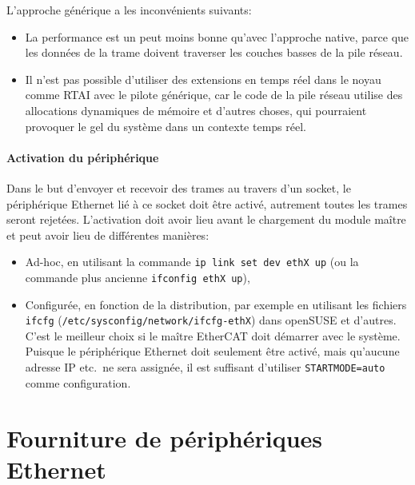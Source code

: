 \documentclass[a4paper,12pt,BCOR=6mm,bibtotoc,idxtotoc]{scrbook}
\begin{document}
L'approche g\'en\'erique a les inconv\'enients suivants:

\begin{itemize}
\item La performance est un peut moins bonne qu'avec l'approche
  native, parce que les donn\'ees de la trame doivent traverser les
  couches basses de la pile r\'eseau.
\item Il n'est pas possible d'utiliser des extensions en temps r\'eel
  dans le noyau comme RTAI avec le pilote g\'en\'erique, car le code
  de la pile r\'eseau utilise des allocations dynamiques de m\'emoire
  et d'autres choses, qui pourraient provoquer le gel du syst\`eme
  dans un contexte temps r\'eel.
\end{itemize}

\paragraph{Activation du p\'eriph\'erique} Dans le but d'envoyer
et recevoir des trames au travers d'un socket, le p\'eriph\'erique
Ethernet li\'e \`a ce socket doit \^etre activ\'e, autrement toutes
les trames seront rejet\'ees.  L'activation doit avoir lieu avant le
chargement du module ma\^itre et peut avoir lieu de diff\'erentes
mani\`eres:

\begin{itemize}

\item Ad-hoc, en utilisant la commande
  \lstinline+ip link set dev ethX up+
  (ou la commande plus ancienne \lstinline+ifconfig ethX up+),

\item Configur\'ee, en fonction de la distribution, par exemple en
  utilisant les fichiers \lstinline+ifcfg+
  (\lstinline+/etc/sysconfig/network/ifcfg-ethX+) dans openSUSE et
  d'autres. C'est le meilleur choix si le ma\^itre EtherCAT doit
  d\'emarrer avec le syst\`eme. Puisque le p\'eriph\'erique Ethernet doit
  seulement \^etre activ\'e, mais qu'aucune adresse IP etc.\ ne sera
  assign\'ee, il est suffisant d'utiliser \lstinline+STARTMODE=auto+
  comme configuration.

\end{itemize}


\section{Fourniture de p\'eriph\'eriques Ethernet}
\label{sec:providing-devices}
\end{document}
